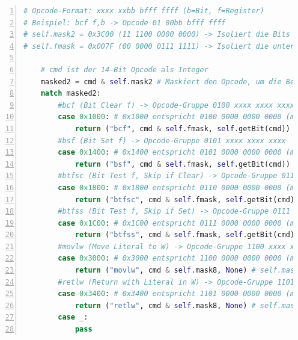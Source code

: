 \begin{lstlisting}[language=Python, caption={Ausschnitt der Decode-Methode im Decode-Modul}, label={lst:decode}, basicstyle=\ttfamily\footnotesize, numbers=left, numberstyle=\tiny\color{gray}]
# Opcode-Format: xxxx xxbb bfff ffff (b=Bit, f=Register)
# Beispiel: bcf f,b -> Opcode 01 00bb bfff ffff
# self.mask2 = 0x3C00 (11 1100 0000 0000) -> Isoliert die Bits 13-10
# self.fmask = 0x007F (00 0000 0111 1111) -> Isoliert die unteren 7 Bits (Register f)

    # cmd ist der 14-Bit Opcode als Integer
    masked2 = cmd & self.mask2 # Maskiert den Opcode, um die Befehlsgruppe zu identifizieren
    match masked2:
        #bcf (Bit Clear f) -> Opcode-Gruppe 0100 xxxx xxxx xxxx
        case 0x1000: # 0x1000 entspricht 0100 0000 0000 0000 (maskiert)
            return ("bcf", cmd & self.fmask, self.getBit(cmd))
        #bsf (Bit Set f) -> Opcode-Gruppe 0101 xxxx xxxx xxxx
        case 0x1400: # 0x1400 entspricht 0101 0000 0000 0000 (maskiert)
            return ("bsf", cmd & self.fmask, self.getBit(cmd))
        #btfsc (Bit Test f, Skip if Clear) -> Opcode-Gruppe 0110 xxxx xxxx xxxx
        case 0x1800: # 0x1800 entspricht 0110 0000 0000 0000 (maskiert)
            return ("btfsc", cmd & self.fmask, self.getBit(cmd))
        #btfss (Bit Test f, Skip if Set) -> Opcode-Gruppe 0111 xxxx xxxx xxxx
        case 0x1C00: # 0x1C00 entspricht 0111 0000 0000 0000 (maskiert)
            return ("btfss", cmd & self.fmask, self.getBit(cmd))
        #movlw (Move Literal to W) -> Opcode-Gruppe 1100 xxxx xxxx xxxx
        case 0x3000: # 0x3000 entspricht 1100 0000 0000 0000 (maskiert)
            return ("movlw", cmd & self.mask8, None) # self.mask8 = 0x00FF
        #retlw (Return with Literal in W) -> Opcode-Gruppe 1101 xxxx xxxx xxxx
        case 0x3400: # 0x3400 entspricht 1101 0000 0000 0000 (maskiert)
            return ("retlw", cmd & self.mask8, None) # self.mask8 = 0x00FF
        case _:
            pass 
\end{lstlisting}


